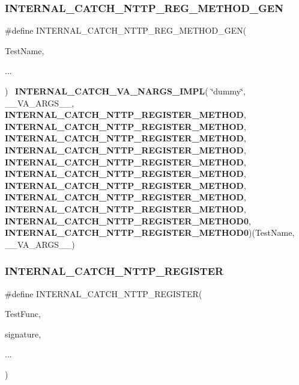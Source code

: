 \subsubsection{INTERNAL\_CATCH\_NTTP\_REG\_METHOD\_GEN}
{\footnotesize\ttfamily \#define I\+N\+T\+E\+R\+N\+A\+L\+\_\+\+C\+A\+T\+C\+H\+\_\+\+N\+T\+T\+P\+\_\+\+R\+E\+G\+\_\+\+M\+E\+T\+H\+O\+D\+\_\+\+G\+EN(\begin{DoxyParamCaption}\item[{}]{Test\+Name,  }\item[{}]{... }\end{DoxyParamCaption})~\textbf{ I\+N\+T\+E\+R\+N\+A\+L\+\_\+\+C\+A\+T\+C\+H\+\_\+\+V\+A\+\_\+\+N\+A\+R\+G\+S\+\_\+\+I\+M\+PL}( \char`\"{}dummy\char`\"{}, \+\_\+\+\_\+\+V\+A\+\_\+\+A\+R\+G\+S\+\_\+\+\_\+, \textbf{ I\+N\+T\+E\+R\+N\+A\+L\+\_\+\+C\+A\+T\+C\+H\+\_\+\+N\+T\+T\+P\+\_\+\+R\+E\+G\+I\+S\+T\+E\+R\+\_\+\+M\+E\+T\+H\+OD}, \textbf{ I\+N\+T\+E\+R\+N\+A\+L\+\_\+\+C\+A\+T\+C\+H\+\_\+\+N\+T\+T\+P\+\_\+\+R\+E\+G\+I\+S\+T\+E\+R\+\_\+\+M\+E\+T\+H\+OD}, \textbf{ I\+N\+T\+E\+R\+N\+A\+L\+\_\+\+C\+A\+T\+C\+H\+\_\+\+N\+T\+T\+P\+\_\+\+R\+E\+G\+I\+S\+T\+E\+R\+\_\+\+M\+E\+T\+H\+OD}, \textbf{ I\+N\+T\+E\+R\+N\+A\+L\+\_\+\+C\+A\+T\+C\+H\+\_\+\+N\+T\+T\+P\+\_\+\+R\+E\+G\+I\+S\+T\+E\+R\+\_\+\+M\+E\+T\+H\+OD}, \textbf{ I\+N\+T\+E\+R\+N\+A\+L\+\_\+\+C\+A\+T\+C\+H\+\_\+\+N\+T\+T\+P\+\_\+\+R\+E\+G\+I\+S\+T\+E\+R\+\_\+\+M\+E\+T\+H\+OD}, \textbf{ I\+N\+T\+E\+R\+N\+A\+L\+\_\+\+C\+A\+T\+C\+H\+\_\+\+N\+T\+T\+P\+\_\+\+R\+E\+G\+I\+S\+T\+E\+R\+\_\+\+M\+E\+T\+H\+OD}, \textbf{ I\+N\+T\+E\+R\+N\+A\+L\+\_\+\+C\+A\+T\+C\+H\+\_\+\+N\+T\+T\+P\+\_\+\+R\+E\+G\+I\+S\+T\+E\+R\+\_\+\+M\+E\+T\+H\+OD}, \textbf{ I\+N\+T\+E\+R\+N\+A\+L\+\_\+\+C\+A\+T\+C\+H\+\_\+\+N\+T\+T\+P\+\_\+\+R\+E\+G\+I\+S\+T\+E\+R\+\_\+\+M\+E\+T\+H\+OD}, \textbf{ I\+N\+T\+E\+R\+N\+A\+L\+\_\+\+C\+A\+T\+C\+H\+\_\+\+N\+T\+T\+P\+\_\+\+R\+E\+G\+I\+S\+T\+E\+R\+\_\+\+M\+E\+T\+H\+OD}, \textbf{ I\+N\+T\+E\+R\+N\+A\+L\+\_\+\+C\+A\+T\+C\+H\+\_\+\+N\+T\+T\+P\+\_\+\+R\+E\+G\+I\+S\+T\+E\+R\+\_\+\+M\+E\+T\+H\+O\+D0}, \textbf{ I\+N\+T\+E\+R\+N\+A\+L\+\_\+\+C\+A\+T\+C\+H\+\_\+\+N\+T\+T\+P\+\_\+\+R\+E\+G\+I\+S\+T\+E\+R\+\_\+\+M\+E\+T\+H\+O\+D0})(Test\+Name, \+\_\+\+\_\+\+V\+A\+\_\+\+A\+R\+G\+S\+\_\+\+\_\+)}

\mbox{\label{catch_8hpp_a3f4b5b59a0890d8f4b5ccde153f52b91}} 
\subsubsection{INTERNAL\_CATCH\_NTTP\_REGISTER}
{\footnotesize\ttfamily \#define I\+N\+T\+E\+R\+N\+A\+L\+\_\+\+C\+A\+T\+C\+H\+\_\+\+N\+T\+T\+P\+\_\+\+R\+E\+G\+I\+S\+T\+ER(\begin{DoxyParamCaption}\item[{}]{Test\+Func,  }\item[{}]{signature,  }\item[{}]{... }\end{DoxyParamCaption})}

